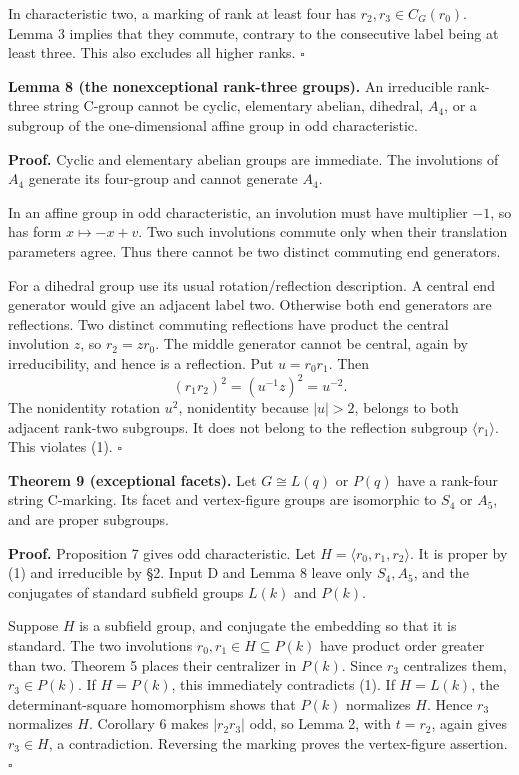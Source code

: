\documentclass[
  11pt,
  a4paper,
]{article}
\newcounter{none} %
\begin{document}
In characteristic two, a marking of rank at least four has
\(r_2,r_3\in C_G(r_0)\). Lemma 3 implies that they commute, contrary to
the consecutive label being at least three. This also excludes all
higher ranks. \(\square\)

\textbf{Lemma 8 (the nonexceptional rank-three groups).} An irreducible
rank-three string C-group cannot be cyclic, elementary abelian,
dihedral, \(A_4\), or a subgroup of the one-dimensional affine group in
odd characteristic.

\textbf{Proof.} Cyclic and elementary abelian groups are immediate. The
involutions of \(A_4\) generate its four-group and cannot generate
\(A_4\).

In an affine group in odd characteristic, an involution must have
multiplier \(-1\), so has form \(x\mapsto-x+v\). Two such involutions
commute only when their translation parameters agree. Thus there cannot
be two distinct commuting end generators.

For a dihedral group use its usual rotation/reflection description. A
central end generator would give an adjacent label two. Otherwise both
end generators are reflections. Two distinct commuting reflections have
product the central involution \(z\), so \(r_2=zr_0\). The middle
generator cannot be central, again by irreducibility, and hence is a
reflection. Put \(u=r_0r_1\). Then \[
 (r_1r_2)^2=(u^{-1}z)^2=u^{-2}.
\] The nonidentity rotation \(u^2\), nonidentity because \(|u|>2\),
belongs to both adjacent rank-two subgroups. It does not belong to the
reflection subgroup \(\langle r_1\rangle\). This violates (1).
\(\square\)

\textbf{Theorem 9 (exceptional facets).} Let \(G\cong L(q)\) or \(P(q)\)
have a rank-four string C-marking. Its facet and vertex-figure groups
are isomorphic to \(S_4\) or \(A_5\), and are proper subgroups.

\textbf{Proof.} Proposition 7 gives odd characteristic. Let
\(H=\langle r_0,r_1,r_2\rangle\). It is proper by (1) and irreducible by
§2. Input D and Lemma 8 leave only \(S_4,A_5\), and the conjugates of
standard subfield groups \(L(k)\) and \(P(k)\).

Suppose \(H\) is a subfield group, and conjugate the embedding so that
it is standard. The two involutions \(r_0,r_1\in H\subseteq P(k)\) have
product order greater than two. Theorem 5 places their centralizer in
\(P(k)\). Since \(r_3\) centralizes them, \(r_3\in P(k)\). If
\(H=P(k)\), this immediately contradicts (1). If \(H=L(k)\), the
determinant-square homomorphism shows that \(P(k)\) normalizes \(H\).
Hence \(r_3\) normalizes \(H\). Corollary 6 makes \(|r_2r_3|\) odd, so
Lemma 2, with \(t=r_2\), again gives \(r_3\in H\), a contradiction.
Reversing the marking proves the vertex-figure assertion. \(\square\)
\end{document}
